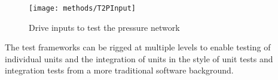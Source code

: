\begin{figure}
\centering
\texttt{[image: methods/T2PInput]}
\caption{Drive inputs to test the pressure network}
\label{fig:TestNetworkInputs}
\end{figure}

The test frameworks can be rigged at multiple levels to enable testing of
individual units and the integration of units in the style of unit tests and
integration tests from a more traditional software background.
